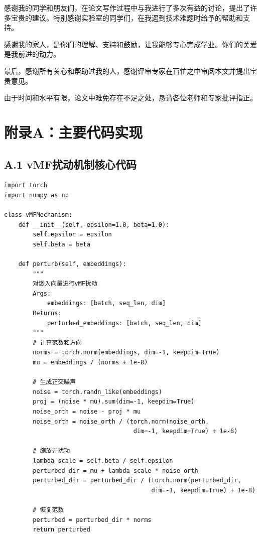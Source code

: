 \documentclass[a4paper,12pt]{article}
\begin{document}
感谢我的同学和朋友们，在论文写作过程中与我进行了多次有益的讨论，提出了许多宝贵的建议。特别感谢实验室的同学们，在我遇到技术难题时给予的帮助和支持。

感谢我的家人，是你们的理解、支持和鼓励，让我能够专心完成学业。你们的关爱是我前进的动力。

最后，感谢所有关心和帮助过我的人，感谢评审专家在百忙之中审阅本文并提出宝贵意见。

由于时间和水平有限，论文中难免存在不足之处，恳请各位老师和专家批评指正。

\newpage
\section*{附录A：主要代码实现}

\subsection*{A.1 vMF扰动机制核心代码}

\begin{verbatim}
import torch
import numpy as np

class vMFMechanism:
    def __init__(self, epsilon=1.0, beta=1.0):
        self.epsilon = epsilon
        self.beta = beta

    def perturb(self, embeddings):
        """
        对嵌入向量进行vMF扰动
        Args:
            embeddings: [batch, seq_len, dim]
        Returns:
            perturbed_embeddings: [batch, seq_len, dim]
        """
        # 计算范数和方向
        norms = torch.norm(embeddings, dim=-1, keepdim=True)
        mu = embeddings / (norms + 1e-8)

        # 生成正交噪声
        noise = torch.randn_like(embeddings)
        proj = (noise * mu).sum(dim=-1, keepdim=True)
        noise_orth = noise - proj * mu
        noise_orth = noise_orth / (torch.norm(noise_orth,
                                    dim=-1, keepdim=True) + 1e-8)

        # 缩放并扰动
        lambda_scale = self.beta / self.epsilon
        perturbed_dir = mu + lambda_scale * noise_orth
        perturbed_dir = perturbed_dir / (torch.norm(perturbed_dir,
                                         dim=-1, keepdim=True) + 1e-8)

        # 恢复范数
        perturbed = perturbed_dir * norms
        return perturbed
\end{verbatim}
\end{document}
